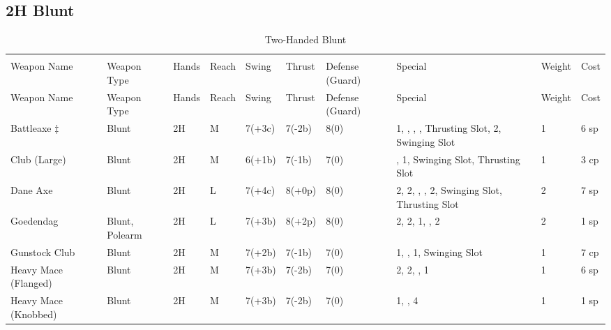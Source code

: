 \documentclass[oneside,11pt,english]{book}
\begin{document}
\subsection{2H Blunt}\vspace{-15pt}
\begin{longtabu} to 1\linewidth {X[2,l]XX[-1,c]X[-1,c]XXX[-1,c]X[2,l]X[-3,c]X[-3,r]}
  \captionsetup{labelformat=blank,textformat=empty}
  \caption{Two-Handed Blunt}\vspace{-15pt}
  \label{tab:2H Blunt}\\
  Weapon Name						&Weapon Type	&Hands&Reach&Swing&Thrust&Defense (Guard)&Special						&Weight	&Cost\\\toprule\endfirsthead
  Weapon Name				&Weapon Type	&Hands	&Reach	&Swing&Thrust&Defense (Guard)&Special																	&Weight	&Cost\\\toprule\endhead
  { Battleaxe \hyperref[wep:battleaxe-1h]{$\ddagger $} \label{wep:battleaxe-2h}}				&Blunt			&2H		&M		&7(+3c)&7(-2b)&8(0)& 1, , , , Thrusting Slot,  2, Swinging Slot	&1 &6 sp\\
  Club (Large) 			&Blunt			&2H		&M		&6(+1b)&7(-1b)&7(0)&,  1, Swinging Slot, Thrusting Slot								&1 &3 cp\\
  Dane Axe 				&Blunt			&2H		&L		&7(+4c)&8(+0p)&8(0)& 2,  2, , ,  2, Swinging Slot, Thrusting Slot	&2 &7 sp\\
  Goedendag 				&Blunt, Polearm	&2H		&L		&7(+3b)&8(+2p)&8(0)& 2,  2,  1, ,  2							&2 &1 sp\\
  Gunstock Club 			&Blunt			&2H		&M		&7(+2b)&7(-1b)&7(0)& 1, ,  1, Swinging Slot									&1 &7 cp\\
  Heavy Mace (Flanged)	&Blunt			&2H		&M		&7(+3b)&7(-2b)&7(0)& 2,  2, ,  1										&1 &6 sp\\
  Heavy Mace (Knobbed)	&Blunt			&2H		&M		&7(+3b)&7(-2b)&7(0)& 1, ,  4													&1 &1 sp\\

\end{longtabu}
\end{document}
